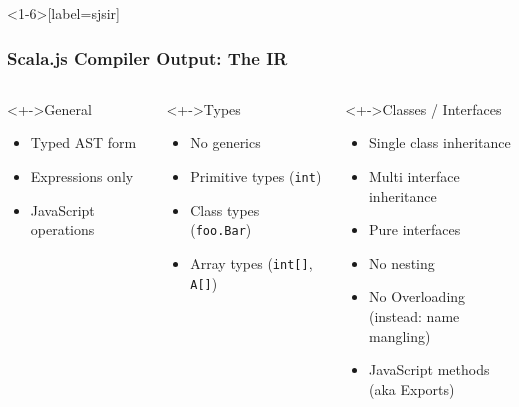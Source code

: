 \documentclass{beamer}
\begin{document}
\begin{frame}<1-6>[label=sjsir]
  \frametitle{Scala.js Compiler Output: The IR}

  \begin{columns}[t]
    \begin{block}<+->{General}
      \begin{itemize}
      \item Typed AST form
      \item<alert@8-10> Expressions only
      \item<alert@4-6> JavaScript operations
      \end{itemize}
    \end{block}

    \begin{block}<+->{Types}
      \begin{itemize}
      \item No generics
      \item Primitive types (\texttt{int})
      \item<alert@9-10> Class types (\texttt{foo.Bar})
      \item<alert@10> Array types (\texttt{int[]}, \texttt{A[]})
      \end{itemize}
    \end{block}

    \begin{block}<+->{Classes / Interfaces}
      \begin{itemize}
      \item Single class inheritance
      \item Multi interface inheritance
      \item Pure interfaces
      \item No nesting
      \item<alert@5-6> No Overloading\\
        (instead: name mangling)
      \item<alert@6> JavaScript methods\\
        (aka Exports)
      \end{itemize}
    \end{block}

  \end{columns}
\end{frame}
\end{document}
